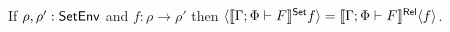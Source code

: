 \documentclass[runningheads]{llncs}
\renewcommand{\id}{\mathit{id}}
\renewcommand{\id}{\mathit{id}}
\begin{document}
\begin{lemma}%
  \label{lem:graph}
  If $\rho, \rho' : \mathsf{SetEnv}$ and $f : \rho \to \rho'$
  then $\langle {\llbracket{\Gamma; \Phi \vdash F}\rrbracket^{\mathsf{Set}}f} \rangle =
\llbracket{\Gamma; \Phi \vdash F}\rrbracket^{\mathsf{Rel}}\langle {f} \rangle$.
\end{lemma}
\begin{comment}
\begin{proof}
Applying Equation~\ref{lem:rel-transf-morph} to the morphisms $(f,
\id_{\rho'}) : \graph{f} \to \Eq_{\rho'}$ and $(\id_{\rho}, f) :
\Eq_{\rho} \to \graph{f}$ of relation environments gives that
$(\setsem{\Gamma; \Phi \vdash F}f, \setsem{\Gamma; \Phi \vdash
  F}\id_{\rho'}) = \relsem{\Gamma; \Phi \vdash F} (f, \id_{\rho'}) :
\relsem{\Gamma; \Phi \vdash F}\graph{f} \to \relsem{\Gamma; \Phi
  \vdash F}\Eq_{\rho'}$ and $(\setsem{\Gamma; \Phi \vdash
  F}\id_{\rho}, \setsem{\Gamma; \Phi \vdash F}f) = \relsem{\Gamma;
  \Phi \vdash F} (\id_{\rho}, f) : \relsem{\Gamma; \Phi \vdash
  F}\Eq_{\rho} \to \relsem{\Gamma; \Phi \vdash F}\graph{f}$.
Expanding the first equation gives that if $(x,y) \in \relsem{\Gamma;
  \Phi \vdash F}\graph{f}$ then $(\setsem{\Gamma; \Phi \vdash F} f\,
x, \setsem{\Gamma; \Phi \vdash F}\id_{\rho'}\, y) \in \relsem{\Gamma;
  \Phi \vdash F}\Eq_{\rho'}$. So $\setsem{\Gamma; \Phi \vdash
  F}\id_{\rho'}\, y = \id_{\setsem{\Gamma; \Phi \vdash F}\rho'}\, y =
y$ and $\relsem{\Gamma; \Phi \vdash F}\Eq_{\rho'} =
\Eq_{\setsem{\Gamma; \Phi \vdash F}\rho'}$, and if $(x,y) \in
\relsem{\Gamma; \Phi \vdash F}\graph{f}$ then $(\setsem{\Gamma; \Phi
  \vdash F} f\, x, y) \in \Eq_{\setsem{\Gamma; \Phi \vdash F}\rho'}$,
i.e., $\setsem{\Gamma; \Phi \vdash F} f\, x = y$, i.e., $(x, y) \in
\graph{\setsem{\Gamma; \Phi \vdash F} f}$.  So, we have that
$\relsem{\Gamma; \Phi \vdash F}\graph{f} \subseteq
\graph{\setsem{\Gamma; \Phi \vdash F}f}$.  Expanding the second
equation gives that if $x \in \setsem{\Gamma; \Phi \vdash F}\rho$ then
$(\setsem{\Gamma; \Phi \vdash F}\id_{\rho}\, x,$\\
$\setsem{\Gamma; \Phi
  \vdash F} f\, x) \in \relsem{\Gamma; \Phi \vdash F}\graph{f}$.  Then
$\setsem{\Gamma; \Phi \vdash F}\id_{\rho}\, x = \id_{\setsem{\Gamma;
    \Phi \vdash F}\rho} x = x$, so for any $x \in \setsem{\Gamma; \Phi
  \vdash F}\rho$ we have that $(x, \setsem{\Gamma; \Phi \vdash F}f\,
x) \in \relsem{\Gamma; \Phi \vdash F}\graph{f}$.  Moreover, $x \in
\setsem{\Gamma; \Phi \vdash F}\rho$ if and only if $(x,
\setsem{\Gamma; \Phi \vdash F} f\, x) \in \graph{\setsem{\Gamma; \Phi
    \vdash F}f}$ and, if $x \in \setsem{\Gamma; \Phi \vdash F}\rho$
then $(x, \setsem{\Gamma; \Phi \vdash F} f\, x) \in \relsem{\Gamma;
  \Phi \vdash F} \graph{f}$, so if $(x, \setsem{\Gamma; \Phi \vdash F}
f\, x) \in \graph{\setsem{\Gamma; \Phi \vdash F}f}$ then $(x,
\setsem{\Gamma; \Phi \vdash F} f\, x) \in \relsem{\Gamma; \Phi \vdash
  F} \graph{f}$, i.e., $\graph{\setsem{\Gamma; \Phi \vdash F}f}
\subseteq \relsem{\Gamma; \Phi \vdash F} \graph{f}$.
\end{proof}
\end{comment}
\end{document}
